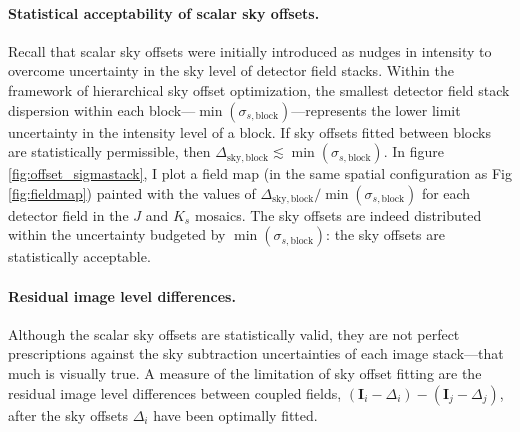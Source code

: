 \documentclass[iop]{emulateapj}
\newcommand{\vect}[1]{\boldsymbol{#1}} %
\begin{document}
\paragraph{Statistical acceptability of scalar sky offsets.} Recall that scalar sky offsets were initially introduced as nudges in intensity to overcome uncertainty in the sky level of detector field stacks. Within the framework of hierarchical sky offset optimization, the smallest detector field stack dispersion within each block---$\min(\sigma_{s,\mathrm{block}})$---represents the lower limit uncertainty in the intensity level of a block. If sky offsets fitted between blocks are statistically permissible, then $\Delta_\mathrm{sky,block} \lesssim \min (\sigma_{s,\mathrm{block}})$. In figure \ref{fig:offset_sigmastack}, I plot a field map (in the same spatial configuration as Fig \ref{fig:fieldmap}) painted with the values of $\Delta_\mathrm{sky,block} / \min (\sigma_{s,\mathrm{block}})$ for each detector field in the $J$ and $K_s$ mosaics. The sky offsets are indeed distributed within the uncertainty budgeted by $\min (\sigma_{s,\mathrm{block}})$: the sky offsets are statistically acceptable.

% 



\paragraph{Residual image level differences.} Although the scalar sky offsets are statistically valid, they are not perfect prescriptions against the sky subtraction uncertainties of each image stack---that much is visually true. A measure of the limitation of sky offset fitting are the residual image level differences between coupled fields, $(\vect{I}_i - \Delta_i) - (\vect{I}_j - \Delta_j)$, after the sky offsets $\Delta_i$ have been optimally fitted.
\end{document}
